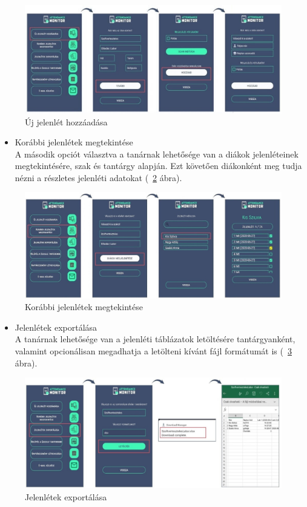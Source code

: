 \documentclass[12pt]{article}
\numberwithin{figure}{section}
\numberwithin{equation}{section}
\begin{document}
\begin{figure}[H]
	\centering
	\includegraphics[width=480px]{t_2.jpg}
	\caption{Új jelenlét hozzáadása}
	\label{fig:t_2}
\end{figure}


\begin{itemize}
	\item {Korábbi jelenlétek megtekintése}\\
	A második opciót választva a tanárnak lehetősége van a diákok jelenléteinek megtekintésére, szak és tantárgy alapján. Ezt követően diákonként meg tudja nézni a részletes jelenléti adatokat (~\ref{fig:t_3} ábra).
\end{itemize}


\begin{figure}[H]
	\centering
	\includegraphics[width=480px]{t_3.jpg}
	\caption{Korábbi jelenlétek megtekintése}
	\label{fig:t_3}
\end{figure}


\begin{itemize}
	\item {Jelenlétek exportálása}\\
	A tanárnak lehetősége van a jelenléti táblázatok letöltésére tantárgyanként, valamint opcionálisan megadhatja a letölteni kívánt fájl formátumát is (~\ref{fig:t_4} ábra).
\end{itemize}


\begin{figure}[H]
	\centering
	\includegraphics[width=480px]{t_4.jpg}
	\caption{Jelenlétek exportálása}
	\label{fig:t_4}
\end{figure}
\end{document}
